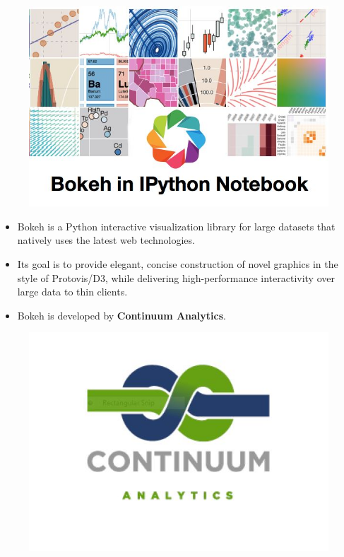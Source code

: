 \documentclass[12pt, a4paper]{report}
\begin{document}
	\large



\begin{figure}[h!]
\centering
\includegraphics[width=0.9\linewidth]{images/TitleSlide}
\end{figure}
{
\Large
	\begin{itemize}
\item Bokeh is a Python interactive visualization library for large datasets that natively uses the latest web technologies.
\item Its goal is to provide elegant, concise construction of novel 
graphics in the style of Protovis/D3, while delivering high-performance interactivity over large data to thin clients.
	\end{itemize}
}


\newpage
{
\LARGE
\begin{itemize}
\item Bokeh is developed by \textbf{Continuum Analytics}.
\end{itemize}
}\begin{figure}[h!]
\centering
\includegraphics[width=1.0\linewidth]{images/continuum}
\end{figure}
\end{document}
